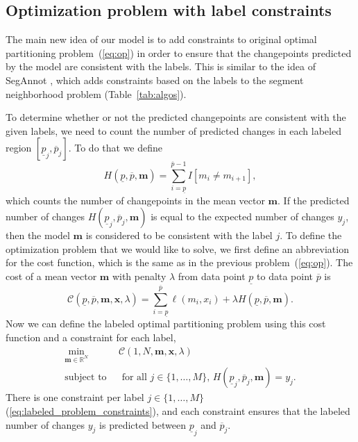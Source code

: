 \documentclass[12pt]{article}
\begin{document}
\subsection{Optimization problem with label constraints}

The main new idea of our model is to add constraints to original optimal partitioning problem~(\ref{eq:op}) in order to ensure that the changepoints predicted by the model are consistent with the labels. This is similar to the idea of SegAnnot \citep{Hocking2014}, which adds constraints based on the labels to the segment neighborhood problem (Table~\ref{tab:algos}).

To determine whether or not the predicted changepoints are consistent with the given labels, we need to count the number of predicted changes in each labeled region $[\underline p_j, \overline p_j]$. To do that we define 
$$
H(\underline p, \overline p, \mathbf m) =
    \sum_{i=\underline p}^{\overline p-1}
    I[m_i \neq m_{i+1}],
$$
which counts the number of changepoints in the mean vector $\mathbf m$.
If the predicted number of changes $H(\underline p_j, \overline p_j, \mathbf m)$ is equal to the expected number of changes $y_j$, then the model $\mathbf m$ is considered to be consistent with the label $j$.
To define the optimization problem that we would like to solve, we first define an abbreviation for the cost function, which is the same as in the previous problem~(\ref{eq:op}). The cost of a mean vector $\mathbf m$ with penalty $\lambda$ from data point $\underline p$ to data point $\overline p$ is 
$$
    \mathcal C(\underline p, \overline p, \mathbf m, \mathbf x, \lambda) = 
    \sum_{i=\underline p}^{\overline p} 
    \ell(m_i, x_i) 
    +\lambda
    H(\underline p, \overline p, \mathbf m).
$$
Now we can define the labeled optimal partitioning problem using this cost function and a constraint for each label,
\begin{align}
 \min_{
  \mathbf m\in\mathbb R^{N}
  } &\ \ 
  \label{eq:labeled_problem_cost}
\mathcal C(1, N, \mathbf m, \mathbf x, \lambda)
\\
    \text{subject to} 
& \ \ \text{ for all } j\in\{1,\dots,M\},\, 
H(\underline p_j, \overline p_j, \mathbf m)=y_j.
\label{eq:labeled_problem_constraints}
\end{align}
There is one constraint per label $j\in\{1,\dots, M\}$ (\ref{eq:labeled_problem_constraints}),
and each constraint ensures that the labeled number of changes $y_j$ is predicted between $\underline p_j$ and $\overline p_j$.
\end{document}
